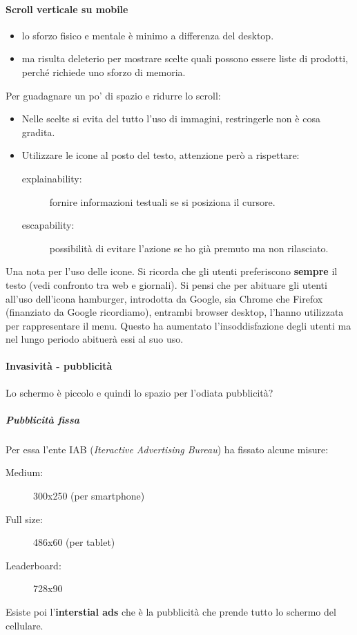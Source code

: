 			\paragraph{Scroll verticale su mobile}
				\begin{itemize}
					\item lo sforzo fisico e mentale è minimo a differenza del desktop.
					\item ma risulta deleterio per mostrare scelte quali possono essere liste di prodotti, perché richiede uno sforzo di memoria.
				\end{itemize}
				Per guadagnare un po' di spazio e ridurre lo scroll:
				\begin{itemize}
					\item Nelle scelte si evita del tutto l'uso di immagini, restringerle non è cosa gradita.
					\item Utilizzare le icone al posto del testo, attenzione però a rispettare:
					\begin{description}
						\item [explainability:] fornire informazioni testuali se si posiziona il cursore.
						\item [escapability:] possibilità di evitare l'azione se ho già premuto ma non rilasciato. 
					\end{description}
				\end{itemize}	
				
				Una nota per l'uso delle icone. Si ricorda che gli utenti preferiscono \textbf{sempre} il testo (vedi confronto tra web e giornali). Si pensi che per abituare gli utenti all'uso dell'icona hamburger, introdotta da Google, sia Chrome che Firefox (finanziato da Google ricordiamo), entrambi browser desktop, l'hanno utilizzata per rappresentare il menu. Questo ha aumentato l'insoddisfazione degli utenti ma nel lungo periodo abituerà essi al suo uso.
		
			\paragraph{Invasività - pubblicità}
				Lo schermo è piccolo e quindi lo spazio per l'odiata pubblicità?
				
				\subparagraph{Pubblicità fissa}
					Per essa l'ente IAB (\emph{Iteractive Advertising Bureau}) ha fissato alcune misure:
				\begin{description}
					\item[Medium:] 300x250 (per smartphone)
					\item[Full size:] 486x60 (per tablet)
					\item[Leaderboard:] 728x90
				\end{description}
				Esiste poi l'\textbf{interstial ads} che è la pubblicità che prende tutto lo schermo del cellulare. 
				
